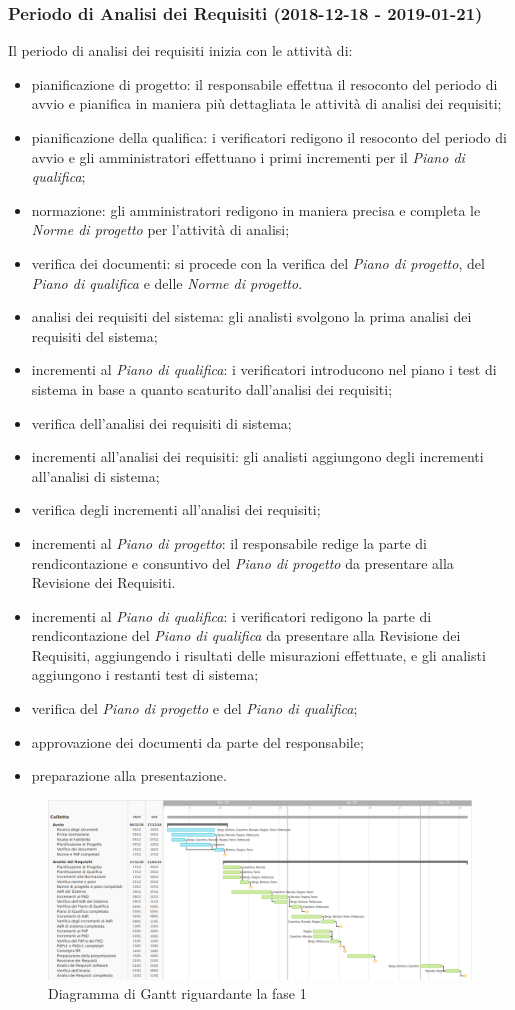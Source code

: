 	\subsubsection{Periodo di Analisi dei Requisiti (2018-12-18 - 2019-01-21)}	
 Il periodo di analisi dei requisiti inizia con le attività di:
			\begin{itemize}
				\item pianificazione di progetto: il responsabile effettua il resoconto del periodo di avvio e pianifica in maniera più dettagliata le attività di analisi dei requisiti; 
				\item pianificazione della qualifica: i verificatori redigono il resoconto del periodo di avvio e gli amministratori effettuano i primi incrementi per il \textit{Piano di qualifica};
				\item normazione: gli amministratori redigono in maniera precisa e completa le \textit{Norme di progetto} per l'attività di analisi;
				\item verifica dei documenti: si procede con la verifica del \textit{Piano di progetto}, del \textit{Piano di qualifica} e delle \textit{Norme di progetto}.
				\item analisi dei requisiti del sistema: gli analisti svolgono la prima analisi dei requisiti del sistema;
				\item incrementi al \textit{Piano di qualifica}: i verificatori introducono nel piano i test di sistema in base a quanto scaturito dall'analisi dei requisiti;
				\item verifica dell'analisi dei requisiti di sistema;
				\item incrementi all'analisi dei requisiti: gli analisti aggiungono degli incrementi all'analisi di sistema;
				\item verifica degli incrementi all'analisi dei requisiti;
				\item incrementi al \textit{Piano di progetto}: il responsabile redige la parte di rendicontazione e consuntivo del \textit{Piano di progetto} da presentare alla Revisione dei Requisiti.
				\item incrementi al \textit{Piano di qualifica}: i verificatori redigono la parte di rendicontazione del \textit{Piano di qualifica} da presentare alla Revisione dei Requisiti, aggiungendo i risultati delle misurazioni effettuate, e gli analisti aggiungono i restanti test di sistema;
				\item verifica del \textit{Piano di progetto} e del \textit{Piano di qualifica};
				\item approvazione dei documenti da parte del responsabile;
				\item preparazione alla presentazione.			
			\end{itemize}
			
\begin{figure}[h]
	\centering
	\includegraphics[scale=0.33]{images/ganttan.png}
	\caption{Diagramma di Gantt riguardante la fase 1}
\end{figure}